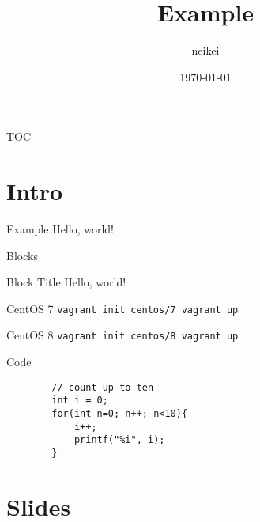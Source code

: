 \documentclass{beamer}
\title{Example}
\date{\today}
\author{neikei}
\institute{TechMeetup}
\begin{document}
\maketitle

    \begin{frame}{TOC}
        \tableofcontents
    \end{frame}

\section{Intro}

    \begin{frame}{Example}
        Hello, world!
    \end{frame}

    \begin{frame}{Blocks}    
        \begin{alertblock}{Block Title}
        Hello, world!
        \end{alertblock}

        \begin{block}{CentOS 7}
            \texttt{vagrant init centos/7 \newline vagrant up}
        \end{block}

        \begin{block}{CentOS 8}
            \texttt{vagrant init centos/8 \newline vagrant up}
        \end{block}
    \end{frame}

	\begin{frame}[fragile]{Code} %
		\begin{verbatim}
		// count up to ten
		int i = 0;
		for(int n=0; n++; n<10){
			i++;
			printf("%i", i);
		}
		\end{verbatim}
	\end{frame}

\section{Slides}
\end{document}
